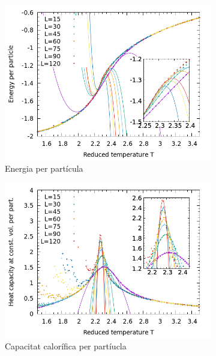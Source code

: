 \documentclass[a4paper]{article}
\begin{document}
\begin{figure}[H]
    \centering
    \begin{subfigure}{.4\textwidth}
        \centering
        \includegraphics[width=\textwidth]{plot-e-fit.png}
        \caption{Energia per partícula}
        \label{fig:fit-e}
    \end{subfigure}
    \begin{subfigure}{.4\textwidth}
        \centering
        \includegraphics[width=\textwidth]{plot-cv-fit.png}
        \caption{Capacitat calorífica per partíucla}
        \label{fig:fit-cv}
    \end{subfigure}
        \begin{subfigure}{.45\textwidth}
        \centering

\end{subfigure}
\end{figure}
\end{document}
